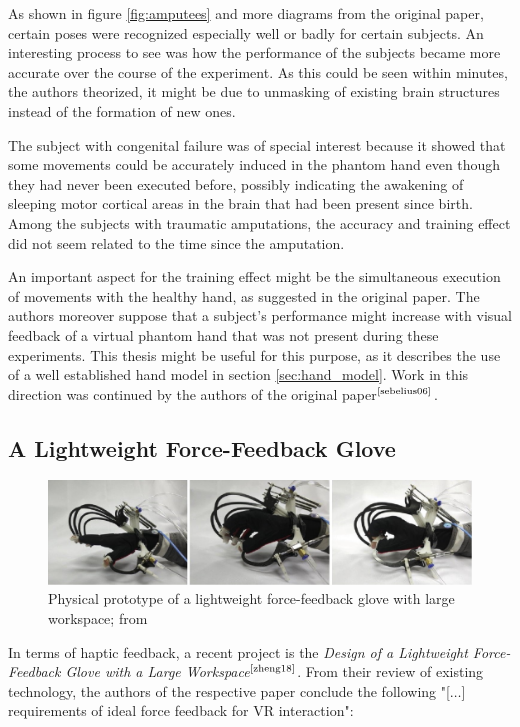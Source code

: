 \documentclass[hyperref, bachelorofscience]{cgvpub}
\newcommand{\newcite}[1]{$ ^{\text{\cite{#1}}} $}
\begin{document}
As shown in figure \ref{fig:amputees} and more diagrams from the original paper, certain poses were recognized especially well or badly for certain subjects. An interesting process to see was how the performance of the subjects became more accurate over the course of the experiment. As this could be seen within minutes, the authors theorized, it might be due to unmasking of existing brain structures instead of the formation of new ones. 

The subject with congenital failure was of special interest because it showed that some movements could be accurately induced in the phantom hand even though they had never been executed before, possibly indicating the awakening of sleeping motor cortical areas in the brain that had been present since birth. Among the subjects with traumatic amputations, the accuracy and training effect did not seem related to the time since the amputation.

An important aspect for the training effect might be the simultaneous execution of movements with the healthy hand, as suggested in the original paper. The authors moreover suppose that a subject's performance might increase with visual feedback of a virtual phantom hand that was not present during these experiments. This thesis might be useful for this purpose, as it describes the use of a well established hand model in section \ref{sec:hand_model}. Work in this direction was continued by the authors of the original paper\newcite{sebelius06}.

\subsection{A Lightweight Force-Feedback Glove}
\begin{figure}
	\centering
	\includegraphics{../pics/force_feedback_proto}
	\caption{Physical prototype of a lightweight force-feedback glove with large workspace; from 
		\cite{zheng18}}
	\label{fig:force_feedback_proto}
\end{figure}

In terms of haptic feedback, a recent project is the \emph{Design of a Lightweight Force-Feedback Glove with a Large Workspace}\newcite{zheng18}. From their review of existing technology, the authors of the respective paper conclude the following "[$\dots$] requirements of ideal force feedback for VR interaction":
\end{document}
